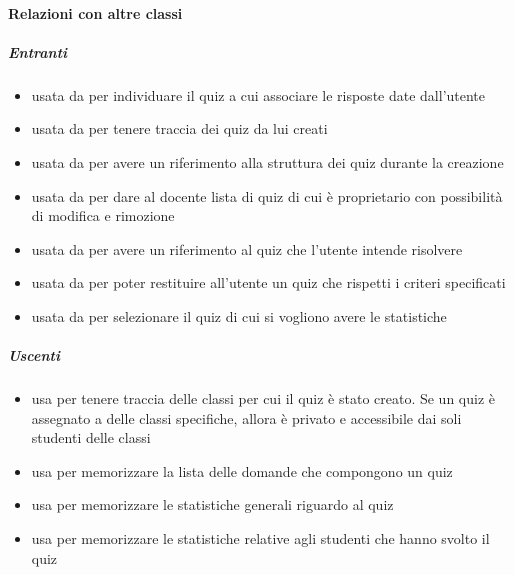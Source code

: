 \paragraph{Relazioni con altre classi}
\subparagraph{Entranti}
\begin{itemize}
\item usata da  per individuare il quiz a cui associare le risposte date dall'utente
\item usata da  per tenere traccia dei quiz da lui creati
\item usata da  per avere un riferimento alla struttura dei quiz durante la creazione
\item usata da  per dare al docente lista di quiz di cui è proprietario con possibilità di modifica e rimozione
\item usata da  per avere un riferimento al quiz che l'utente intende risolvere
\item usata da  per poter restituire all'utente un quiz che rispetti i criteri specificati
\item usata da  per selezionare il quiz di cui si vogliono avere le statistiche
\end{itemize}
\subparagraph{Uscenti}
\begin{itemize}
\item usa  per tenere traccia delle classi per
cui il quiz è stato creato. Se un quiz è assegnato a delle classi specifiche, allora è privato e
accessibile dai soli studenti delle classi
\item usa  per memorizzare la lista delle domande che compongono un quiz
\item usa  per memorizzare le statistiche generali riguardo al quiz
\item usa  per memorizzare le statistiche relative agli studenti che hanno svolto il quiz
\end{itemize}
